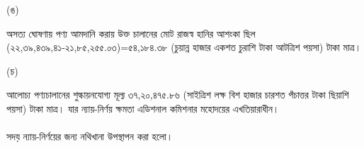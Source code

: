 \documentclass[12pt]{article}
\begin{document}
\begin{minipage}[t]{0.05\linewidth}
\hspace{1em}
\end{minipage}
\begin{minipage}[t]{0.05\linewidth}
(ঙ)
\end{minipage}
\begin{minipage}[t]{0.90\linewidth}
অসত্য ঘোষণায় পণ্য আমদানি করায় উক্ত
চালানের মোট রাজস্ব হানির আশংকা ছিল
(২২,৩৯,৪৩৯,৪১-২১,৮৫,২৫৫.০৩)=৫৪,১৮৪.৩৮
(চুয়ান্ন হাজার একশত চুরাশি টাকা আটত্রিশ পয়সা) টাকা মাত্র।
\\
\end{minipage}
\begin{minipage}[t]{0.05\linewidth}
\hspace{1em}
\end{minipage}
\begin{minipage}[t]{0.05\linewidth}
(চ)
\end{minipage}
\begin{minipage}[t]{0.90\linewidth}
আলোচ্য পণ্যচালানের শুল্কায়নযোগ্য মূল্য
৩৭,২০,৪৭৫.৮৬ (সাইত্রিশ লক্ষ বিশ হাজার
চারশত পঁচাত্তর টাকা ছিয়াশি পয়সা) টাকা মাত্র।
যার ন্যায়-নির্ণয় ক্ষমতা এডিশনাল কমিশনার
মহোদয়ের এখতিয়ারাধীন।
\\
\\
\normalsize
সদয় ন্যায়-নির্ণয়ের জন্য নথিখানা উপস্থাপন করা হলো।
\end{minipage}
\end{document}
